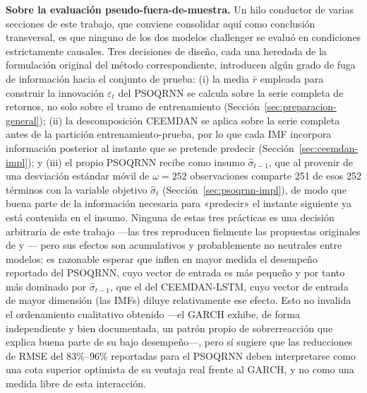 \documentclass[12pt]{paper}
\begin{document}
\textbf{Sobre la evaluación pseudo-fuera-de-muestra.} Un hilo conductor de varias secciones de este trabajo, que conviene consolidar aquí como conclusión transversal, es que ninguno de los dos modelos challenger se evaluó en condiciones estrictamente causales. Tres decisiones de diseño, cada una heredada de la formulación original del método correspondiente, introducen algún grado de fuga de información hacia el conjunto de prueba: (i) la media $\bar{r}$ empleada para construir la innovación $\varepsilon_t$ del PSOQRNN se calcula sobre la serie completa de retornos, no solo sobre el tramo de entrenamiento (Sección~\ref{sec:preparacion-general}); (ii) la descomposición CEEMDAN se aplica sobre la serie completa antes de la partición entrenamiento-prueba, por lo que cada IMF incorpora información posterior al instante que se pretende predecir (Sección~\ref{sec:ceemdan-impl}); y (iii) el propio PSOQRNN recibe como insumo $\hat{\sigma}_{t-1}$, que al provenir de una desviación estándar móvil de $\omega = 252$ observaciones comparte 251 de esos 252 términos con la variable objetivo $\hat{\sigma}_t$ (Sección~\ref{sec:psoqrnn-impl}), de modo que buena parte de la información necesaria para «predecir» el instante siguiente ya está contenida en el insumo. Ninguna de estas tres prácticas es una decisión arbitraria de este trabajo —las tres reproducen fielmente las propuestas originales de \citet{pradeepkumar2017forecasting} y \citet{cao2019financial}— pero sus efectos son acumulativos y probablemente no neutrales entre modelos: es razonable esperar que inflen en mayor medida el desempeño reportado del PSOQRNN, cuyo vector de entrada es más pequeño y por tanto más dominado por $\hat{\sigma}_{t-1}$, que el del CEEMDAN-LSTM, cuyo vector de entrada de mayor dimensión (las IMFs) diluye relativamente ese efecto. Esto no invalida el ordenamiento cualitativo obtenido —el GARCH exhibe, de forma independiente y bien documentada, un patrón propio de sobrerreacción que explica buena parte de su bajo desempeño—, pero sí sugiere que las reducciones de RMSE del 83\%--96\% reportadas para el PSOQRNN deben interpretarse como una cota superior optimista de su ventaja real frente al GARCH, y no como una medida libre de esta interacción.
\end{document}
